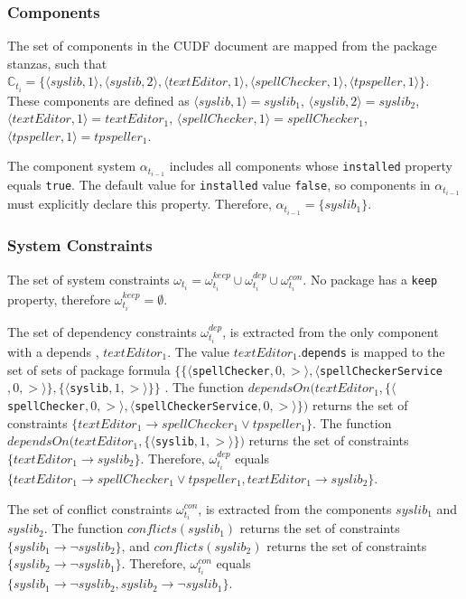 \subsubsection{Components}
The set of components in the CUDF document are mapped from the package stanzas,
such that $\mathbb{C}_{t_i} = \{\langle syslib,1 \rangle, \langle syslib,2\rangle,  \langle textEditor,1 \rangle,  \langle spellChecker,1 \rangle,  \langle tpspeller,1 \rangle\}$.
These components are defined as
$\langle syslib,1 \rangle = syslib_1$, $\langle syslib,2\rangle = syslib_2 $,  $\langle textEditor,1 \rangle =  textEditor_1 $,  
$\langle spellChecker,1 \rangle =  spellChecker_1 $,  $\langle tpspeller,1 \rangle =  tpspeller_1 $.

The component system $\alpha_{t_{i-1}}$ includes all components whose \verb+installed+ property equals \verb+true+.
The default value for \verb+installed+ value \verb+false+, so components in $\alpha_{t_{i-1}}$ must explicitly declare this property.
Therefore, $\alpha_{t_{i-1}} = \{ syslib_1 \}$.

\subsubsection{System Constraints}
The set of system constraints $\omega_{t_i} = \omega_{t_i}^{keep} \cup \omega_{t_i}^{dep} \cup \omega_{t_i}^{con}$.
No package has a \texttt{keep} property, therefore $\omega_{t_i}^{keep} = \emptyset$.


The set of dependency  constraints $\omega_{t_i}^{dep}$, is extracted from the only component with a depends , $textEditor_1$.
The value $textEditor_1$.\texttt{depends} is mapped to the set of sets of package formula $\{\{\langle $\verb+spellChecker+$,0,>\rangle,\langle $\verb+spellCheckerService+$,0,>\rangle\},\{\langle $\verb+syslib+$,1,>\rangle\}\}$ .
The function $dependsOn(textEditor_1 , \{\langle $\verb+spellChecker+$,0,>\rangle,\langle $\verb+spellCheckerService+$,0,>\rangle\} )$
returns the set of constraints $\{textEditor_1 \rightarrow spellChecker_1 \vee tpspeller_1\}$.
The function $dependsOn(textEditor_1 , \{\langle $\verb+syslib+$,1,>\rangle\} )$
returns the set of constraints  $\{textEditor_1 \rightarrow syslib_2\}$.
Therefore, $\omega_{t_i}^{dep}$ equals $\{textEditor_1 \rightarrow spellChecker_1 \vee tpspeller_1 , textEditor_1 \rightarrow syslib_2\}$.

The set of conflict  constraints $\omega_{t_i}^{con}$, is extracted from the components $syslib_1$ and $syslib_2$.
The function $conflicts(syslib_1)$ returns the set of constraints $\{syslib_1 \rightarrow \neg syslib_2\}$,
and  $conflicts(syslib_2)$ returns the set of constraints $\{syslib_2 \rightarrow \neg syslib_1\}$.
Therefore, $\omega_{t_i}^{con}$ equals $\{syslib_1 \rightarrow \neg syslib_2, syslib_2 \rightarrow \neg syslib_1\}$.

